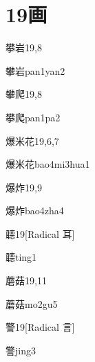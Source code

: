 
\section*{19画}

\begin{entry}{攀岩}{19,8}
  \begin{phonetics}{攀岩}{pan1yan2}
  \end{phonetics}
\end{entry}

\begin{entry}{攀爬}{19,8}
  \begin{phonetics}{攀爬}{pan1pa2}
  \end{phonetics}
\end{entry}

\begin{entry}{爆米花}{19,6,7}
  \begin{phonetics}{爆米花}{bao4mi3hua1}
  \end{phonetics}
\end{entry}

\begin{entry}{爆炸}{19,9}
  \begin{phonetics}{爆炸}{bao4zha4}
  \end{phonetics}
\end{entry}

\begin{entry}{聼}{19}[Radical 耳]
  \begin{phonetics}{聼}{ting1}
  \end{phonetics}
\end{entry}

\begin{entry}{蘑菇}{19,11}
  \begin{phonetics}{蘑菇}{mo2gu5}
  \end{phonetics}
\end{entry}

\begin{entry}{警}{19}[Radical 言]
  \begin{phonetics}{警}{jing3}
  \end{phonetics}
\end{entry}

